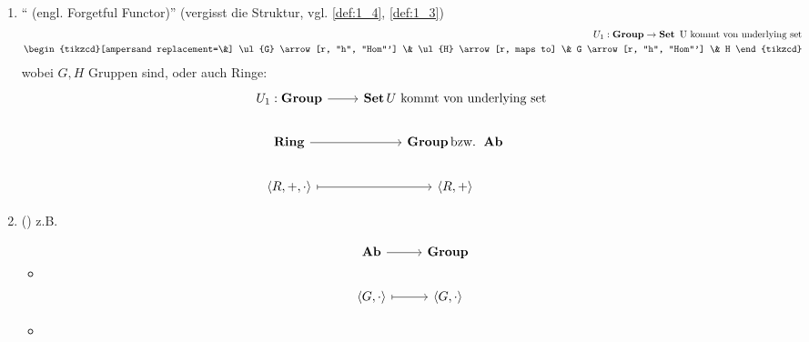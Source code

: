 \begin{beispiel}
	\begin{enumerate}
		\item `` (engl. Forgetful Functor)'' (vergisst die Struktur, vgl. \ref{def:1_4}, \ref{def:1_3})
		\begin{align*}
			U_1: \Group \to \Set \text{ U kommt von underlying set}\\
			\begin{tikzcd}[ampersand replacement=\&]
			\ul{G} \arrow[r, "h", "Hom"'] \& \ul{H} \arrow[r, maps to] \& G \arrow[r, "h", "Hom"'] \& H
			\end{tikzcd}
		\end{align*}
		wobei $G,H$ Gruppen sind, oder auch Ringe:
		\begin{align*} %
			\begin{tikzcd}[ampersand replacement=\&]
			U_1: \Group \arrow[r] \& \Set U\text{ kommt von underlying set}\\
			\Ring \arrow[r] \& \Group \text{bzw. } \Ab\\
			\langle R, + , \cdot\rangle \arrow[r, maps to] \& \langle R, + \rangle
			\end{tikzcd}
		\end{align*}
		\item {} ()
		z.B.
		\begin{itemize}
			\item 
			\begin{align*}
				\begin{tikzcd}[ampersand replacement=\&]
				\Ab \arrow[r]                                 \& \Group                     \\
				{\langle G, \cdot \rangle} \arrow[r, maps to] \& {\langle G, \cdot \rangle}
				\end{tikzcd}
			\end{align*}
			\item 

\end{itemize}
\end{enumerate}
\end{beispiel}
